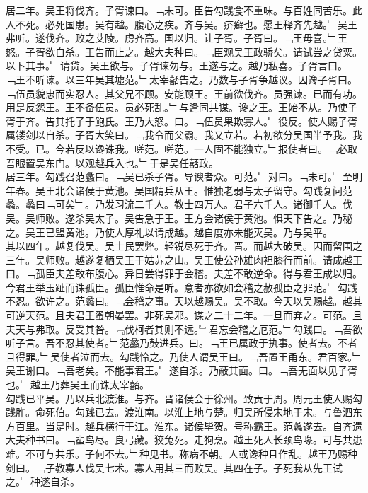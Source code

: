 \documentclass{zhvt-classic}
\begin{document}
\hspace*{2em}居二年。吴王将伐齐。子胥谏曰。﹁未可。臣告勾践食不重味。与百姓同苦乐。此人不死。必死国患。吴有越。腹心之疾。齐与吴。疥癣也。愿王释齐先越。﹂吴王弗听。遂伐齐。败之艾陵。虏齐高。国以归。让子胥。子胥曰。﹁王毋喜。﹂王怒。子胥欲自杀。王告而止之。越大夫种曰。﹁臣观吴王政骄矣。请试尝之贷粟。以卜其事。﹂请贷。吴王欲与。子胥谏勿与。王遂与之。越乃私喜。子胥言曰。﹁王不听谏。以三年吴其墟范。﹂太宰嚭告之。乃数与子胥争越议。因谗子胥曰。﹁伍员貌忠而实忍人。其父兄不顾。安能顾王。王前欲伐齐。员强谏。已而有功。用是反怨王。王不备伍员。员必死乱。﹂与逢同共谋。谗之王。王始不从。乃使子胥于齐。告其托子于鲍氏。王乃大怒。曰。﹁伍员果欺寡人。﹂役反。使人赐子胥属镂剑以自杀。子胥大笑曰。﹁我令而父霸。我又立若。若初欲分吴国半予我。我不受。已。今若反以谗诛我。嗟范。嗟范。一人固不能独立。﹂报使者曰。﹁必取吾眼置吴东门。以观越兵入也。﹂于是吴任嚭政。\\
\hspace*{2em}居三年。勾践召范蠡曰。﹁吴已杀子胥。导谀者众。可范。﹂对曰。﹁未可。﹂至明年春。吴王北会诸侯于黄池。吴国精兵从王。惟独老弱与太子留守。勾践复问范蠡。蠡曰﹁可矣﹂。乃发习流二千人。教士四万人。君子六千人。诸御千人。伐吴。吴师败。遂杀吴太子。吴告急于王。王方会诸侯于黄池。惧天下告之。乃秘之。吴王已盟黄池。乃使人厚礼以请成越。越自度亦未能灭吴。乃与吴平。\\
\hspace*{2em}其以四年。越复伐吴。吴士民罢弊。轻锐尽死于齐。晋。而越大破吴。因而留围之三年。吴师败。越遂复栖吴王于姑苏之山。吴王使公孙雄肉袒膝行而前。请成越王曰。﹁孤臣夫差敢布腹心。异日尝得罪于会稽。夫差不敢逆命。得与君王成以归。今君王举玉趾而诛孤臣。孤臣惟命是听。意者亦欲如会稽之赦孤臣之罪范。﹂勾践不忍。欲许之。范蠡曰。﹁会稽之事。天以越赐吴。吴不取。今天以吴赐越。越其可逆天范。且夫君王蚤朝晏罢。非死吴邪。谋之二十二年。一旦而弃之。可范。且夫天与弗取。反受其咎。﹃伐柯者其则不远。﹄君忘会稽之厄范。﹂勾践曰。﹁吾欲听子言。吾不忍其使者。﹂范蠡乃鼓进兵。曰。﹁王已属政于执事。使者去。不者且得罪。﹂吴使者泣而去。勾践怜之。乃使人谓吴王曰。﹁吾置王甬东。君百家。﹂吴王谢曰。﹁吾老矣。不能事君王。﹂遂自杀。乃蔽其面。曰。﹁吾无面以见子胥也。﹂越王乃葬吴王而诛太宰嚭。\\
\hspace*{2em}勾践已平吴。乃以兵北渡淮。与齐。晋诸侯会于徐州。致贡于周。周元王使人赐勾践胙。命死伯。勾践已去。渡淮南。以淮上地与楚。归吴所侵宋地于宋。与鲁泗东方百里。当是时。越兵横行于江。淮东。诸侯毕贺。号称霸王。范蠡遂去。自齐遗大夫种书曰。﹁蜚鸟尽。良弓藏。狡兔死。走狗烹。越王死人长颈鸟喙。可与共患难。不可与共乐。子何不去。﹂种见书。称病不朝。人或谗种且作乱。越王乃赐种剑曰。﹁子教寡人伐吴七术。寡人用其三而败吴。其四在子。子死我从先王试之。﹂种遂自杀。\\
\end{document}
